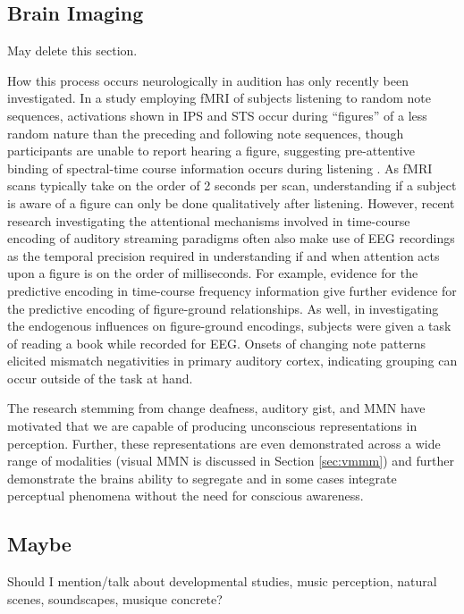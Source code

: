 \documentclass[a4paper,11pt,final]{ThesisStyle}
\begin{document}
\subsection{Brain Imaging}

May delete this section.

How this process occurs neurologically in audition has only recently been investigated. In a study employing fMRI of subjects listening to random note sequences, activations shown in IPS and STS occur during ``figures'' of a less random nature than the preceding and following note sequences, though participants are unable to report hearing a figure, suggesting pre-attentive binding of spectral-time course information occurs during listening \cite{Teki2011a}. As fMRI scans typically take on the order of 2 seconds per scan, understanding if a subject is aware of a figure can only be done qualitatively after listening.  However, recent research investigating the attentional mechanisms involved in time-course encoding of auditory streaming paradigms often also make use of EEG recordings as the temporal precision required in understanding if and when attention acts upon a figure is on the order of milliseconds.  For example, evidence for the predictive encoding in time-course frequency information \cite{Winkler2009} give further evidence for the predictive encoding of figure-ground relationships.  As well, in investigating the endogenous influences on figure-ground encodings, subjects were given a task of reading a book while recorded for EEG.  Onsets of changing note patterns elicited mismatch negativities in primary auditory cortex, indicating grouping can occur outside of the task at hand.

The research stemming from change deafness, auditory gist, and MMN have motivated that we are capable of producing unconscious representations in perception.  Further, these representations are even demonstrated across a wide range of modalities (visual MMN is discussed in Section \ref{sec:vmmm}) and further demonstrate the brains ability to segregate and in some cases integrate perceptual phenomena without the need for conscious awareness.  

\subsection{Maybe}

Should I mention/talk about developmental studies, music perception, natural scenes, soundscapes, musique concrete?
\end{document}

